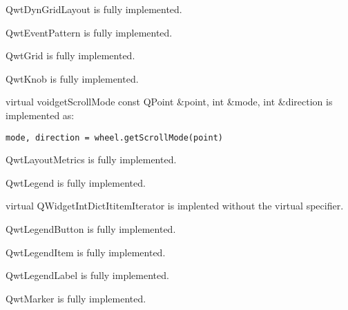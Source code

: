 \documentclass{manual}
\begin{document}
\begin{classdesc*}{QwtDynGridLayout}
  is fully implemented.
\end{classdesc*}

\begin{classdesc*}{QwtEventPattern}
  is fully implemented.
\end{classdesc*}

\begin{classdesc*}{QwtGrid}
  is fully implemented.
\end{classdesc*}

\begin{classdesc*}{QwtKnob}
  is fully implemented.

  \begin{cfuncdesc}{virtual void}{getScrollMode}{
      const QPoint \&point, int \&mode, int \&direction}
    is implemented as:
    \begin{verbatim}
mode, direction = wheel.getScrollMode(point)
    \end{verbatim}    
  \end{cfuncdesc}

\end{classdesc*}

\begin{classdesc*}{QwtLayoutMetrics}
  is fully implemented.
\end{classdesc*}

\begin{classdesc*}{QwtLegend}
  is fully implemented.

  \begin{cfuncdesc}{virtual QWidgetIntDictIt}{itemIterator}{}
    is implented without the virtual specifier.
  \end{cfuncdesc}
\end{classdesc*}

\begin{classdesc*}{QwtLegendButton}
  is fully implemented.
\end{classdesc*}

\begin{classdesc*}{QwtLegendItem}
  is fully implemented.
\end{classdesc*}

\begin{classdesc*}{QwtLegendLabel}
  is fully implemented.
\end{classdesc*}

\begin{classdesc*}{QwtMarker}
  is fully implemented.
\end{classdesc*}
\end{document}
